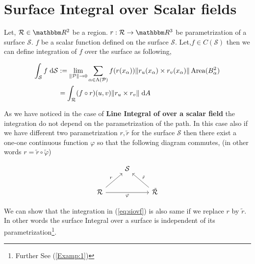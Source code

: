 \documentclass[../Analysis-3]{subfiles}
\begin{document}
\section{Surface Integral over Scalar fields}

Let, $\mathcal{R} \in \R^2$ be a region. $r:\mathcal{R} \to \R^3$ be parametrization of a surface $\mathcal{S}$. $f$ be a scalar function defined on the surface $\mathcal{S}$. Let,$f \in C(\mathcal{S})$ then we can define integration of $f$ over the surface as following,

\begin{align}
    \int_{\mathcal{S}} f \hspace{0.1cm} \dd \mathcal{S} & := \lim_{\norm{\mathcal{P}} \to 0} \sum_{\alpha \in \Lambda (\mathcal{P})} f(r(x_{\alpha})) \norm{r_u(x_{\alpha}) \times r_v(x_{\alpha})} \operatorname{Area}(B_{\alpha}^2) \nonumber \\
                                                        & = \int_{\mathcal{R}} (f \circ r)(u,v) \norm{r_u \times r_v} \hspace{0.1cm} \dd A \label{eq:siovf}
\end{align}

As we have noticed in the case of \textbf{Line Integral of over a scalar field} the integration do not depend on the parametrization of the path. In this case also if we have different two parametrization $r, \tilde{r}$ for the surface $\mathcal{S}$ then there exist a one-one continuous function $\varphi$ so that the following diagram commutes, (in other words $r = \tilde{r} \circ \tilde{\varphi}$)

\[\begin{tikzcd}
        & {\mathcal{S}} \\
        {\mathcal{R}} && {\tilde{\mathcal{R}}}
        \arrow["r", from=2-1, to=1-2]
        \arrow["{\tilde{r}}"', from=2-3, to=1-2]
        \arrow["\varphi"', from=2-1, to=2-3]
    \end{tikzcd}\]

We can show that the integration in (\ref{eq:siovf}) is also same if we replace $r$ by $\tilde{r}$. In other words the surface Integral over a surface is independent of its parametrization\footnote{Further See (\ref{Examp:1})}.
\end{document}
